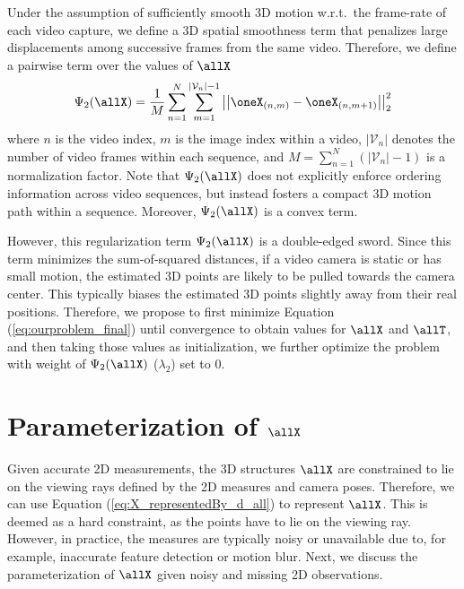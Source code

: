 Under the assumption of sufficiently smooth 3D motion w.r.t.~the frame-rate of each video capture, we define a 3D spatial smoothness term that penalizes large displacements among successive frames from the same video.
Therefore, we define a pairwise term over the values of $\allX$
\begin{equation}
\Psi_2(\allX) = \frac{1}{M} \sum_{n=1}^{N}\sum_{m=1}^{\vert\mathcal V_n\vert-1}\left|\left|\oneX_{(n,m)} - \oneX_{(n,m+1)} \right| \right|_2^2
\end{equation}
where $n$ is the video index, $m$ is the image index within a video, $\vert \mathcal V_n\vert$ denotes the number of video frames within each sequence, and $M=\sum_{n=1}^{N}(\vert \mathcal V_n\vert - 1)$ is a normalization factor.
Note that $\Psi_2(\allX)$ does not explicitly enforce ordering information across video sequences, but instead fosters a compact 3D motion path within a sequence.
Moreover,  $\Psi_2(\allX)$ is a convex term.

However, this regularization term $\Psi_2(\allX)$ is a double-edged sword.
Since this term minimizes the sum-of-squared distances, if a video camera is static or has small motion, the estimated 3D points are likely to be pulled towards the camera center. 
This typically biases the estimated 3D points slightly away from their real positions. 
Therefore, we propose to first minimize Equation (\ref{eq:ourproblem_final}) until convergence to obtain values for $\allX$ and $\allT$, and then taking those values as initialization, we further optimize the problem with weight of $\Psi_2(\allX)$ (\ie $\lambda_2$) set to $0$.



\section{Parameterization of \texorpdfstring{$\allX$}{paramallX}} \label{sec:parameterization}

Given accurate 2D measurements, 
the 3D structures $\allX$ are constrained to lie on the viewing rays defined by the 2D measures and camera poses. Therefore, we can use Equation (\ref{eq:X_representedBy_d_all}) to represent $\allX$. This is deemed as a hard constraint, as the points have to lie on the viewing ray. However, in practice, the measures are typically noisy or unavailable due to, for example, inaccurate feature detection or motion blur. 
Next, we discuss the parameterization of $\allX$ given noisy and missing 2D observations.

